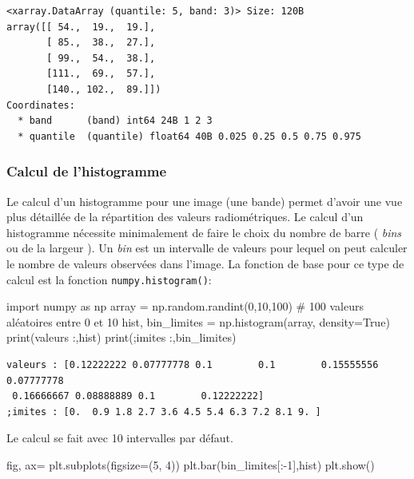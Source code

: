 \documentclass[
  french,
  11pt,
  letterpaper,
  open=any,
  twoside=false,
  french]{scrbook}
\newenvironment{Shaded}{\begin{snugshade}}{\end{snugshade}}
\newcommand{\BuiltInTok}[1]{\textcolor[rgb]{0.00,0.23,0.31}{#1}}
\newcommand{\CommentTok}[1]{\textcolor[rgb]{0.37,0.37,0.37}{#1}}
\newcommand{\DecValTok}[1]{\textcolor[rgb]{0.68,0.00,0.00}{#1}}
\newcommand{\ImportTok}[1]{\textcolor[rgb]{0.00,0.46,0.62}{#1}}
\newcommand{\NormalTok}[1]{\textcolor[rgb]{0.00,0.23,0.31}{#1}}
\newcommand{\OperatorTok}[1]{\textcolor[rgb]{0.37,0.37,0.37}{#1}}
\newcommand{\StringTok}[1]{\textcolor[rgb]{0.13,0.47,0.30}{#1}}
\newcommand{\VariableTok}[1]{\textcolor[rgb]{0.07,0.07,0.07}{#1}}
\begin{document}
\begin{verbatim}
<xarray.DataArray (quantile: 5, band: 3)> Size: 120B
array([[ 54.,  19.,  19.],
       [ 85.,  38.,  27.],
       [ 99.,  54.,  38.],
       [111.,  69.,  57.],
       [140., 102.,  89.]])
Coordinates:
  * band      (band) int64 24B 1 2 3
  * quantile  (quantile) float64 40B 0.025 0.25 0.5 0.75 0.975
\end{verbatim}

\subsubsection{Calcul de l'histogramme}\label{calcul-de-lhistogramme}

Le calcul d'un histogramme pour une image (une bande) permet d'avoir une
vue plus détaillée de la répartition des valeurs radiométriques. Le
calcul d'un histogramme nécessite minimalement de faire le choix du
nombre de barre ( \emph{bins} ou de la largeur ). Un \emph{bin} est un
intervalle de valeurs pour lequel on peut calculer le nombre de valeurs
observées dans l'image. La fonction de base pour ce type de calcul est
la fonction \texttt{numpy.histogram()}:

\begin{Shaded}
\begin{Highlighting}[]
\ImportTok{import}\NormalTok{ numpy }\ImportTok{as}\NormalTok{ np}
\NormalTok{array }\OperatorTok{=}\NormalTok{ np.random.randint(}\DecValTok{0}\NormalTok{,}\DecValTok{10}\NormalTok{,}\DecValTok{100}\NormalTok{) }\CommentTok{\# 100 valeurs aléatoires entre 0 et 10}
\NormalTok{hist, bin\_limites }\OperatorTok{=}\NormalTok{ np.histogram(array, density}\OperatorTok{=}\VariableTok{True}\NormalTok{)}
\BuiltInTok{print}\NormalTok{(}\StringTok{\textquotesingle{}valeurs :\textquotesingle{}}\NormalTok{,hist)}
\BuiltInTok{print}\NormalTok{(}\StringTok{\textquotesingle{};imites :\textquotesingle{}}\NormalTok{,bin\_limites)}
\end{Highlighting}
\end{Shaded}

\begin{verbatim}
valeurs : [0.12222222 0.07777778 0.1        0.1        0.15555556 0.07777778
 0.16666667 0.08888889 0.1        0.12222222]
;imites : [0.  0.9 1.8 2.7 3.6 4.5 5.4 6.3 7.2 8.1 9. ]
\end{verbatim}

Le calcul se fait avec 10 intervalles par défaut.

\begin{Shaded}
\begin{Highlighting}[]
\NormalTok{fig, ax}\OperatorTok{=}\NormalTok{ plt.subplots(figsize}\OperatorTok{=}\NormalTok{(}\DecValTok{5}\NormalTok{, }\DecValTok{4}\NormalTok{))}
\NormalTok{plt.bar(bin\_limites[:}\OperatorTok{{-}}\DecValTok{1}\NormalTok{],hist)}
\NormalTok{plt.show()}
\end{Highlighting}
\end{Shaded}
\end{document}

